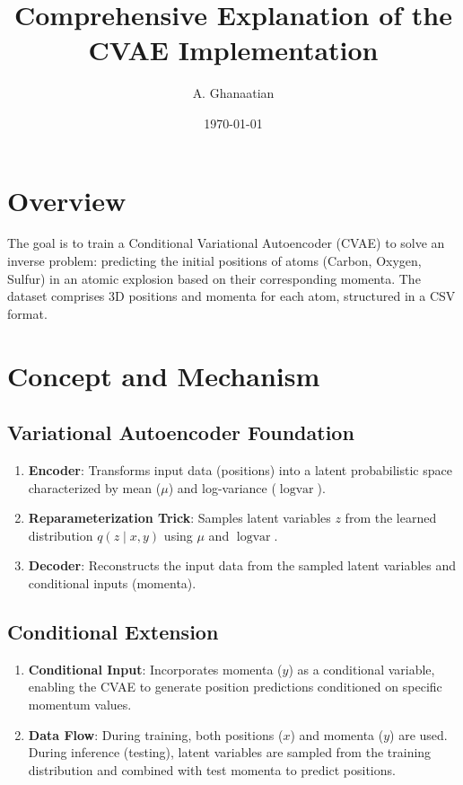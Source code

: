 \documentclass[12pt]{article}
\title{Comprehensive Explanation of the CVAE Implementation}
\author{A. Ghanaatian}
\date{\today}
\begin{document}
\maketitle


\section{Overview}

The goal is to train a Conditional Variational Autoencoder (CVAE) to solve an inverse problem: predicting the initial positions of atoms (Carbon, Oxygen, Sulfur) in an atomic explosion based on their corresponding momenta. The dataset comprises 3D positions and momenta for each atom, structured in a CSV format.

\section{Concept and Mechanism}

\subsection{Variational Autoencoder Foundation}

\begin{enumerate}[label=\alph*.]
    \item \textbf{Encoder}: Transforms input data (positions) into a latent probabilistic space characterized by mean (\(\mu\)) and log-variance (\(\log \text{var}\)).
    \item \textbf{Reparameterization Trick}: Samples latent variables \( z \) from the learned distribution \( q(z \mid x, y) \) using \(\mu\) and \(\log \text{var}\).
    \item \textbf{Decoder}: Reconstructs the input data from the sampled latent variables and conditional inputs (momenta).
\end{enumerate}

\subsection{Conditional Extension}

\begin{enumerate}[label=\alph*.]
    \item \textbf{Conditional Input}: Incorporates momenta (\( y \)) as a conditional variable, enabling the CVAE to generate position predictions conditioned on specific momentum values.
    \item \textbf{Data Flow}: During training, both positions (\( x \)) and momenta (\( y \)) are used. During inference (testing), latent variables are sampled from the training distribution and combined with test momenta to predict positions.
\end{enumerate}
\end{document}
